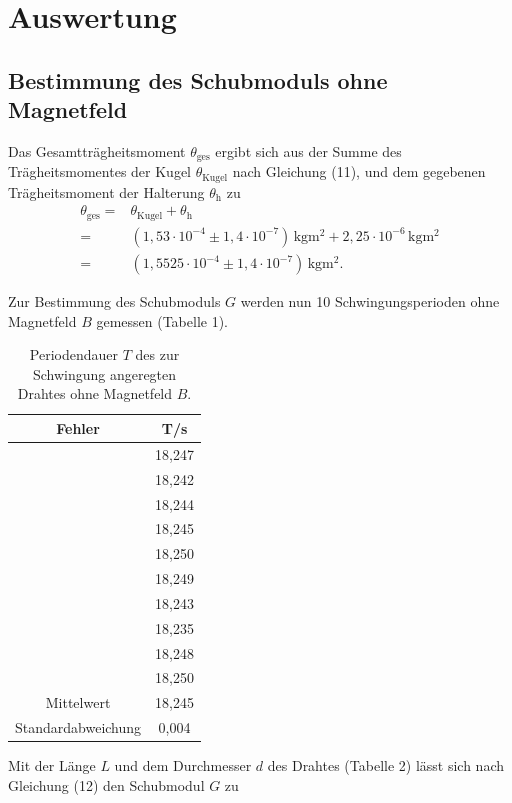 \section{Auswertung}
\label{sec:Auswertung}

\subsection{Bestimmung des Schubmoduls ohne Magnetfeld}
Das Gesamtträgheitsmoment $\theta_\text{ges}$ ergibt sich aus der Summe des Trägheitsmomentes
der Kugel $\theta_\text{Kugel}$ nach Gleichung (11), und dem gegebenen Trägheitsmoment der Halterung $\theta_\text{h}$ zu
\begin{align*}
  \theta_\text{ges} = {} & \theta_\text{Kugel} + \theta_\text{h} \\
                    = {} & (1,53 \cdot 10^{-4} \pm 1,4 \cdot 10^{-7})\,\si{\kilo\gram\meter\squared} + 2,25 \cdot 10^{-6}\,\si{\kilo\gram\meter\squared} \\
                    = {} & (1,5525 \cdot 10^{-4} \pm 1,4 \cdot 10^{-7})\,\si{\kilo\gram\meter\squared}.
\end{align*}

\noindent Zur Bestimmung des Schubmoduls $G$ werden nun 10 Schwingungsperioden ohne Magnetfeld $B$ gemessen (Tabelle 1).


\begin{table}[H]
\centering
\caption{Periodendauer $T$ des zur Schwingung angeregten Drahtes ohne Magnetfeld $B$.}
\label{tab:ohnebfeld}
\begin{tabular}{c c}
\toprule
Fehler & T\:/\:s\\
\midrule
 & 18,247 \\
 & 18,242 \\
 & 18,244 \\
 & 18,245 \\
 & 18,250 \\
 & 18,249 \\
 & 18,243 \\
 & 18,235 \\
 & 18,248 \\
 & 18,250 \\
\hline
Mittelwert & 18,245 \\
Standardabweichung & 0,004 \\
\bottomrule
\end{tabular}
\end{table}

\noindent Mit der Länge $L$ und dem Durchmesser $d$ des Drahtes (Tabelle 2) lässt sich nach Gleichung (12) den Schubmodul $G$ zu 

